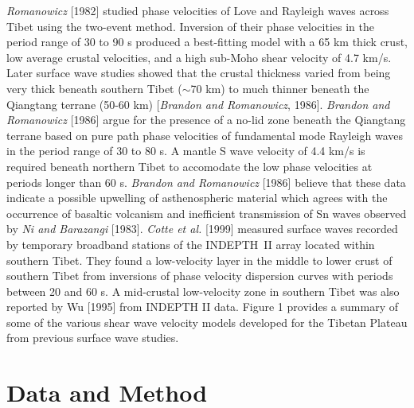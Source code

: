 \documentclass[12pt]{article}
\begin{document}
{\it Romanowicz} [1982] studied phase velocities of Love and Rayleigh waves across Tibet using the
two-event method.    Inversion of their phase velocities in the period range of 30 to
90 s produced a best-fitting model with a 65 km thick crust, low average crustal velocities, and a high sub-Moho
shear velocity of 4.7 km/s.  Later surface wave studies showed that the crustal thickness varied from
being very thick beneath southern Tibet ($\sim$70 km) to much thinner beneath the Qiangtang terrane (50-60
km) [{\it Brandon and Romanowicz}, 1986].  {\it Brandon and Romanowicz} [1986] argue for the presence of a
no-lid zone beneath the Qiangtang terrane based on pure path phase velocities of fundamental mode Rayleigh
waves in the period range of 30 to 80 s.  A mantle S wave velocity of 4.4 km/s  is
required beneath northern Tibet to accomodate the low phase velocities at periods longer than 60 s.  {\it Brandon and Romanowicz}
[1986] believe that these data indicate a possible upwelling of asthenospheric material which agrees with
the occurrence of basaltic volcanism and inefficient transmission of Sn
waves observed by {\it Ni and Barazangi} [1983].  {\it Cotte et al.} [1999] measured surface waves recorded by
temporary broadband stations of the INDEPTH~II array located within southern Tibet.  They found a low-velocity layer in the middle
to lower crust of southern Tibet from inversions of phase velocity dispersion curves with periods between
20 and 60 s.  A mid-crustal low-velocity zone in southern Tibet was also reported by Wu [1995] from INDEPTH II
data. Figure 1 provides a summary of some of the various shear wave velocity models developed for the
Tibetan Plateau from previous surface wave studies.

\section{Data and Method}
\end{document}
